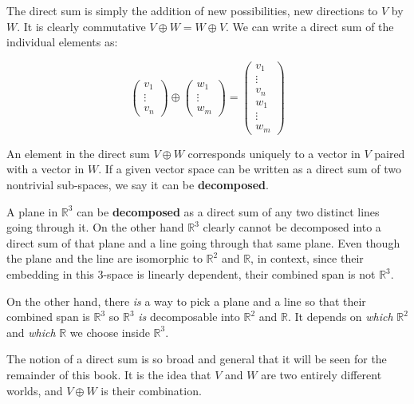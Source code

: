 \documentclass[../master.tex]{subfiles}
\begin{document}
	The direct sum is simply the addition of new possibilities, new directions to $V$ by $W$. It is clearly commutative $V \oplus W = W \oplus V$. We can write a direct sum of the individual elements as:
	
	\begin{equation}
		\begin{pmatrix}
			v_1 \\ \vdots \\v_n 
		\end{pmatrix}
		\oplus
		\begin{pmatrix}
			w_1 \\ \vdots \\w_m
		\end{pmatrix}
		=
		\begin{pmatrix}
			v_1 \\ \vdots \\v_n \\
			w_1 \\ \vdots \\w_m
		\end{pmatrix}
	\end{equation}
	
	An element in the direct sum $V \oplus W$ corresponds uniquely to a vector in $V$ paired with a vector in $W$. If a given vector space can be written as a direct sum of two nontrivial sub-spaces, we say it can be \textbf{decomposed}. 
	\begin{example}
		A plane in $\mathbb R^3$ can be \textbf{decomposed} as a direct sum of any two distinct lines going through it. On the other hand $\mathbb R^3$ clearly cannot be decomposed into a direct sum of that plane and a line going through that same plane. Even though the plane and the line are isomorphic to $\mathbb R^2$ and $\mathbb R$, in context, since their embedding in this 3-space is linearly dependent, their combined span is not $\mathbb{R}^3$.
		
		On the other hand, there \emph{is} a way to pick a plane and a line so that their combined span is $\mathbb R^3$ so $\mathbb R^3$ \emph{is} decomposable into $\mathbb R^2$ and $\mathbb R$. It depends on \emph{which} $\mathbb R^2$ and \emph{which} $\mathbb R$ we choose inside $\mathbb R^3$.
	\end{example}
	
	The notion of a direct sum is so broad and general that it will be seen for the remainder of this book. It is the idea that $V$ and $W$ are two entirely different worlds, and $V \oplus W$ is their combination. 
	
\end{document}
